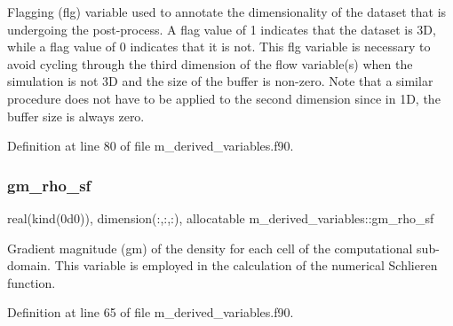 Flagging (flg) variable used to annotate the dimensionality of the dataset that is undergoing the post-\/process. A flag value of 1 indicates that the dataset is 3D, while a flag value of 0 indicates that it is not. This flg variable is necessary to avoid cycling through the third dimension of the flow variable(s) when the simulation is not 3D and the size of the buffer is non-\/zero. Note that a similar procedure does not have to be applied to the second dimension since in 1D, the buffer size is always zero. 



Definition at line 80 of file m\+\_\+derived\+\_\+variables.\+f90.

\mbox{\label{namespacem__derived__variables_a102e235b77ff78573a043c5c9b9bb0d8}} 
\subsubsection{\texorpdfstring{gm\+\_\+rho\+\_\+sf}{gm\_rho\_sf}}
{\footnotesize\ttfamily real(kind(0d0)), dimension(\+:,\+:,\+:), allocatable m\+\_\+derived\+\_\+variables\+::gm\+\_\+rho\+\_\+sf}



Gradient magnitude (gm) of the density for each cell of the computational sub-\/domain. This variable is employed in the calculation of the numerical Schlieren function. 



Definition at line 65 of file m\+\_\+derived\+\_\+variables.\+f90.


